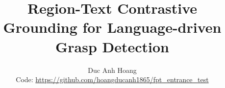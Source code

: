\documentclass[10pt,twocolumn,letterpaper]{article}
\title{Region-Text Contrastive Grounding for Language-driven Grasp Detection}
\author{Duc Anh Hoang\\
{\small Code: \url{https://github.com/hoangducanh1865/fpt_entrance_test}}
}
\begin{document}
\maketitle






{
    \small
    
    
}
\end{document}
